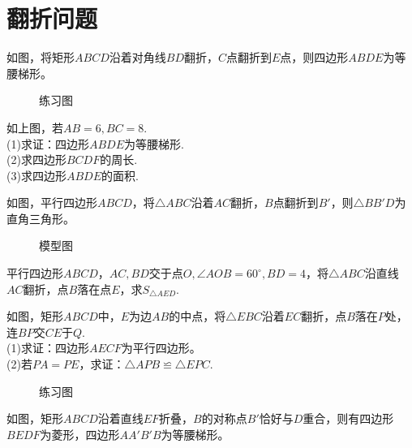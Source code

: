 \section{翻折问题}
\begin{definition}
    如图，将矩形$ABCD$沿着对角线$BD$翻折，$C$点翻折到$E$点，则四边形$ABDE$为等腰梯形。
\end{definition}
\begin{figure}[H]
    \centering
    \resizebox{4cm}{!}{}
    \caption{练习图}
\end{figure}
\begin{problem}
如上图，若$AB=6,BC=8$. \\
(1)求证：四边形$ABDE$为等腰梯形. \\
(2)求四边形$BCDF$的周长. \\
(3)求四边形$ABDE$的面积.
\end{problem}
\begin{definition}
    如图，平行四边形$ABCD$，将$\triangle ABC$沿着$AC$翻折，$B$点翻折到$B'$，则$\triangle BB'D$为直角三角形。\\
\end{definition}
\begin{figure}[H]
    \centering
    \resizebox{4cm}{!}{}
    \caption{模型图}
\end{figure}
\begin{problem}
平行四边形$ABCD$，$AC,BD$交于点$O,\angle AOB=60^\circ,BD=4$，将$\triangle ABC$沿直线$AC$翻折，点$B$落在点$E$，求$S_{\triangle AED}$.
\end{problem}
\begin{problem}
如图，矩形$ABCD$中，$E$为边$AB$的中点，将$\triangle EBC$沿着$EC$翻折，点$B$落在$P$处，连$BP$交$CE$于$Q$. \\
(1)求证：四边形$AECF$为平行四边形。\\
(2)若$PA=PE$，求证：$\triangle APB \backcong \triangle EPC$.
\end{problem}
\begin{figure}[H]
    \centering
    \resizebox{4cm}{!}{}
    \caption{练习图}
\end{figure}
\begin{definition}
    如图，矩形$ABCD$沿着直线$EF$折叠，$B$的对称点$B'$恰好与$D$重合，则有四边形$BEDF$为菱形，四边形$AA'B'B$为等腰梯形。
\end{definition}
